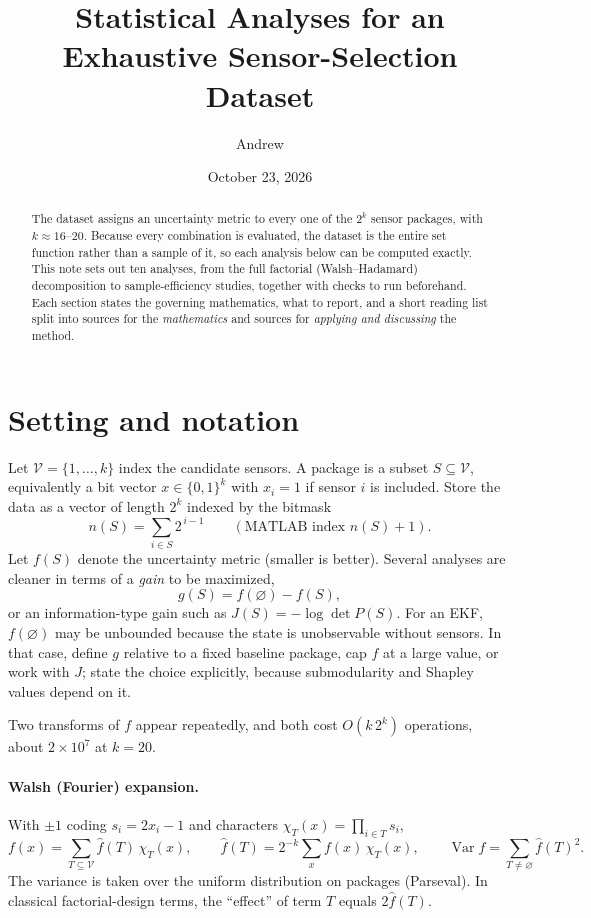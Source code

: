 \documentclass[11pt]{article}
\title{Statistical Analyses for an Exhaustive Sensor-Selection Dataset}
\author{Andrew}
\date{October 23, 2026}
\newcommand{\V}{\mathcal{V}}
\newcommand{\Var}{\operatorname{Var}}
\newcommand{\fh}{\widehat{f}}
\begin{document}
\maketitle

\begin{abstract}
The dataset assigns an uncertainty metric to every one of the $2^k$ sensor packages, with $k\approx 16$--$20$.
Because every combination is evaluated, the dataset is the entire set function rather than a sample of it, so each analysis below can be computed exactly.
This note sets out ten analyses, from the full factorial (Walsh--Hadamard) decomposition to sample-efficiency studies, together with checks to run beforehand.
Each section states the governing mathematics, what to report, and a short reading list split into sources for the \emph{mathematics} and sources for \emph{applying and discussing} the method.
\end{abstract}

\tableofcontents

\section{Setting and notation}\label{sec:notation}

Let $\V=\{1,\dots,k\}$ index the candidate sensors.
A package is a subset $S\subseteq\V$, equivalently a bit vector $x\in\{0,1\}^k$ with $x_i=1$ if sensor $i$ is included.
Store the data as a vector of length $2^k$ indexed by the bitmask
\[
  n(S)=\sum_{i\in S}2^{\,i-1}\qquad(\text{MATLAB index } n(S)+1).
\]
Let $f(S)$ denote the uncertainty metric (smaller is better).
Several analyses are cleaner in terms of a \emph{gain} to be maximized,
\[
  g(S)=f(\varnothing)-f(S),
\]
or an information-type gain such as $J(S)=-\log\det P(S)$.
For an EKF, $f(\varnothing)$ may be unbounded because the state is unobservable without sensors.
In that case, define $g$ relative to a fixed baseline package, cap $f$ at a large value, or work with $J$; state the choice explicitly, because submodularity and Shapley values depend on it.

Two transforms of $f$ appear repeatedly, and both cost $O(k\,2^k)$ operations, about $2\times10^7$ at $k=20$.

\paragraph{Walsh (Fourier) expansion.}
With $\pm1$ coding $s_i=2x_i-1$ and characters $\chi_T(x)=\prod_{i\in T}s_i$,
\begin{equation}\label{eq:walsh}
  f(x)=\sum_{T\subseteq\V}\fh(T)\,\chi_T(x),\qquad
  \fh(T)=2^{-k}\sum_{x}f(x)\,\chi_T(x),\qquad
  \Var f=\sum_{T\neq\varnothing}\fh(T)^2 .
\end{equation}
The variance is taken over the uniform distribution on packages (Parseval).
In classical factorial-design terms, the ``effect'' of term $T$ equals $2\fh(T)$.
\end{document}
